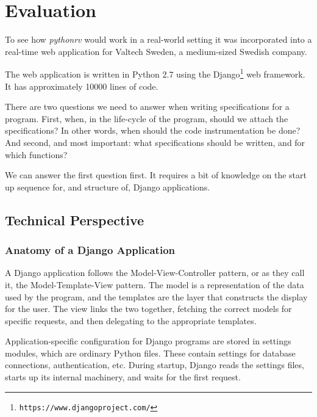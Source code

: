 
\pagestyle{newchap}
\chapter{Evaluation} \label{chapter-evaluation}

To see how \textit{pythonrv} would work in a real-world setting it was
incorporated into a real-time web application for Valtech Sweden, a
medium-sized Swedish company.

The web application is written in Python 2.7 using the
Django\footnote{\texttt{https://www.djangoproject.com/}} web framework. It has
approximately 10000 lines of code.

There are two questions we need to answer when writing specifications for a
program. First, when, in the life-cycle of the program, should we attach the
specifications? In other words, when should the code instrumentation be done?
And second, and most important: what specifications should be written, and for
which functions?

We can answer the first question first. It requires a bit of knowledge on the
start up sequence for, and structure of, Django applications.


\section{Technical Perspective}


\subsection{Anatomy of a Django Application}

A Django application follows the Model-View-Controller pattern, or as they call
it, the Model-Template-View pattern. The model is a representation of the data
used by the program, and the templates are the layer that constructs the
display for the user. The view links the two together, fetching the correct
models for specific requests, and then delegating to the appropriate templates.

Application-specific configuration for Django programs are stored in settings
modules, which are ordinary Python files. These contain settings for database
connections, authentication, etc. During startup, Django reads the settings
files, starts up its internal machinery, and waits for the first request.


